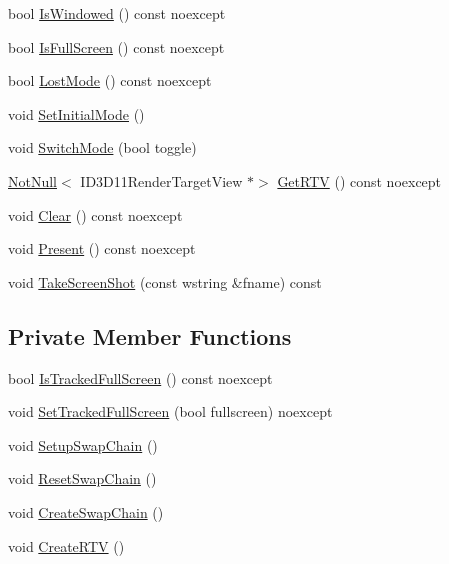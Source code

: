 \begin{DoxyCompactItemize}
\item 
bool \mbox{\hyperlink{classmage_1_1rendering_1_1_swap_chain_1_1_impl_ac7216dc943fad37a078d1a9d18eb1491}{Is\+Windowed}} () const noexcept
\item 
bool \mbox{\hyperlink{classmage_1_1rendering_1_1_swap_chain_1_1_impl_abd74163f68b0a078f970d3d54d1dcd7e}{Is\+Full\+Screen}} () const noexcept
\item 
bool \mbox{\hyperlink{classmage_1_1rendering_1_1_swap_chain_1_1_impl_ad24213091dd95a649f293fb3b3607c34}{Lost\+Mode}} () const noexcept
\item 
void \mbox{\hyperlink{classmage_1_1rendering_1_1_swap_chain_1_1_impl_a910fab71dd7977005e11179080b25f14}{Set\+Initial\+Mode}} ()
\item 
void \mbox{\hyperlink{classmage_1_1rendering_1_1_swap_chain_1_1_impl_aa3c391f6651074e73105174b68025731}{Switch\+Mode}} (bool toggle)
\item 
\mbox{\hyperlink{namespacemage_a8769f9d670d6b585ea306cb1062af94b}{Not\+Null}}$<$ I\+D3\+D11\+Render\+Target\+View $\ast$$>$ \mbox{\hyperlink{classmage_1_1rendering_1_1_swap_chain_1_1_impl_a8c21e6075e67d434701fb63933bc114a}{Get\+R\+TV}} () const noexcept
\item 
void \mbox{\hyperlink{classmage_1_1rendering_1_1_swap_chain_1_1_impl_ab48d24a25bd342f6a3882426e333a716}{Clear}} () const noexcept
\item 
void \mbox{\hyperlink{classmage_1_1rendering_1_1_swap_chain_1_1_impl_ae75839c2c767280d4c7e8ee009fedfe0}{Present}} () const noexcept
\item 
void \mbox{\hyperlink{classmage_1_1rendering_1_1_swap_chain_1_1_impl_abdc55ba548c3178ab3edbeeb39099a4c}{Take\+Screen\+Shot}} (const wstring \&fname) const
\end{DoxyCompactItemize}
\subsection*{Private Member Functions}
\begin{DoxyCompactItemize}
\item 
bool \mbox{\hyperlink{classmage_1_1rendering_1_1_swap_chain_1_1_impl_a47dd7e6a9a21395fc4d79dfda3d9cd61}{Is\+Tracked\+Full\+Screen}} () const noexcept
\item 
void \mbox{\hyperlink{classmage_1_1rendering_1_1_swap_chain_1_1_impl_a6f97179cc5e352a349ed943413d149e7}{Set\+Tracked\+Full\+Screen}} (bool fullscreen) noexcept
\item 
void \mbox{\hyperlink{classmage_1_1rendering_1_1_swap_chain_1_1_impl_a1e34fe9c72a24a0345a9ba317762863d}{Setup\+Swap\+Chain}} ()
\item 
void \mbox{\hyperlink{classmage_1_1rendering_1_1_swap_chain_1_1_impl_afbc1208702d9807bed1126caae22bda6}{Reset\+Swap\+Chain}} ()
\item 
void \mbox{\hyperlink{classmage_1_1rendering_1_1_swap_chain_1_1_impl_a990a602cf4639daa85210b4cbd1e525e}{Create\+Swap\+Chain}} ()
\item 
void \mbox{\hyperlink{classmage_1_1rendering_1_1_swap_chain_1_1_impl_a414e0c397b0c00a893b92845b6918ffc}{Create\+R\+TV}} ()
\end{DoxyCompactItemize}

